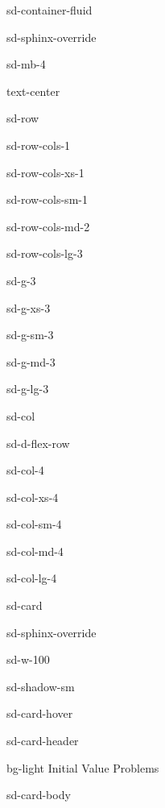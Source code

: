 \documentclass[letterpaper,10pt,english]{jupyterBook}
\begin{document}
\begin{sphinxuseclass}{sd-container-fluid}
\begin{sphinxuseclass}{sd-sphinx-override}
\begin{sphinxuseclass}{sd-mb-4}
\begin{sphinxuseclass}{text-center}
\begin{sphinxuseclass}{sd-row}
\begin{sphinxuseclass}{sd-row-cols-1}
\begin{sphinxuseclass}{sd-row-cols-xs-1}
\begin{sphinxuseclass}{sd-row-cols-sm-1}
\begin{sphinxuseclass}{sd-row-cols-md-2}
\begin{sphinxuseclass}{sd-row-cols-lg-3}
\begin{sphinxuseclass}{sd-g-3}
\begin{sphinxuseclass}{sd-g-xs-3}
\begin{sphinxuseclass}{sd-g-sm-3}
\begin{sphinxuseclass}{sd-g-md-3}
\begin{sphinxuseclass}{sd-g-lg-3}
\begin{sphinxuseclass}{sd-col}
\begin{sphinxuseclass}{sd-d-flex-row}
\begin{sphinxuseclass}{sd-col-4}
\begin{sphinxuseclass}{sd-col-xs-4}
\begin{sphinxuseclass}{sd-col-sm-4}
\begin{sphinxuseclass}{sd-col-md-4}
\begin{sphinxuseclass}{sd-col-lg-4}
\begin{sphinxuseclass}{sd-card}
\begin{sphinxuseclass}{sd-sphinx-override}
\begin{sphinxuseclass}{sd-w-100}
\begin{sphinxuseclass}{sd-shadow-sm}
\begin{sphinxuseclass}{sd-card-hover}
\begin{sphinxuseclass}{sd-card-header}
\begin{sphinxuseclass}{bg-light}
\sphinxAtStartPar
Initial Value Problems

\end{sphinxuseclass}
\end{sphinxuseclass}
\begin{sphinxuseclass}{sd-card-body}
\begin{figure}[htbp]
\centering


\end{figure}
\end{sphinxuseclass}
\end{sphinxuseclass}
\end{sphinxuseclass}
\end{sphinxuseclass}
\end{sphinxuseclass}
\end{sphinxuseclass}
\end{sphinxuseclass}
\end{sphinxuseclass}
\end{sphinxuseclass}
\end{sphinxuseclass}
\end{sphinxuseclass}
\end{sphinxuseclass}
\end{sphinxuseclass}
\end{sphinxuseclass}
\end{sphinxuseclass}
\end{sphinxuseclass}
\end{sphinxuseclass}
\end{sphinxuseclass}
\end{sphinxuseclass}
\end{sphinxuseclass}
\end{sphinxuseclass}
\end{sphinxuseclass}
\end{sphinxuseclass}
\end{sphinxuseclass}
\end{sphinxuseclass}
\end{sphinxuseclass}
\end{sphinxuseclass}
\end{sphinxuseclass}
\end{document}
